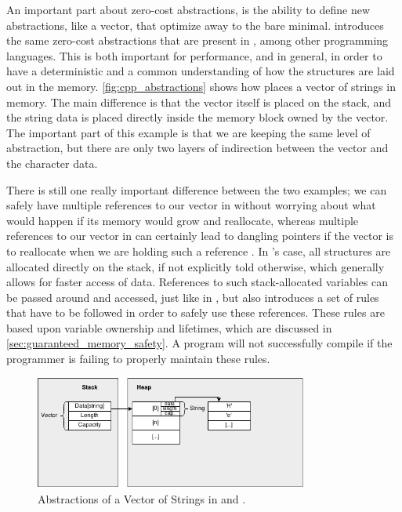 An important part about zero-cost abstractions, is the ability to define new abstractions, like a vector, that optimize away to the bare minimal.
{\rust} introduces the same zero-cost abstractions that are present in {\Cpp}, among other programming languages.
This is both important for performance, and in general, in order to have a deterministic and a common understanding of how the structures are laid out in the memory.
\autoref{fig:cpp_abstractions} shows how {\Cpp} places a vector of strings in memory.
The main difference is that the vector itself is placed on the stack, and the string data is placed directly inside the memory block owned by the vector.
The important part of this example is that we are keeping the same level of abstraction, but there are only two layers of indirection between the vector and the character data.

There is still one really important difference between the two examples; we can safely have multiple references to our vector in {\Java} without worrying about what would happen if its memory would grow and reallocate, whereas multiple references to our vector in {\Cpp} can certainly lead to dangling pointers if the vector is to reallocate when we are holding such a reference
.
In {\rust}'s case, all structures are allocated directly on the stack, if not explicitly told otherwise, which generally allows for faster access of data.
References to such stack-allocated variables can be passed around and accessed, just like in {\Cpp},
but {\rust} also introduces a set of rules that have to be followed in order to safely use these references.
These rules are based upon variable ownership and lifetimes, which are discussed in \autoref{sec:guaranteed_memory_safety}.
A {\rust} program will not successfully compile if the programmer is failing to properly maintain these rules.

\begin{figure}[tb]
  \begin{center}
    \includegraphics[width=0.8\textwidth]{figures/cpp_abstractions}
  \end{center}
  \caption{Abstractions of a Vector of Strings in {\rust} and {\Cpp}.}
  \label{fig:cpp_abstractions}
\end{figure}

